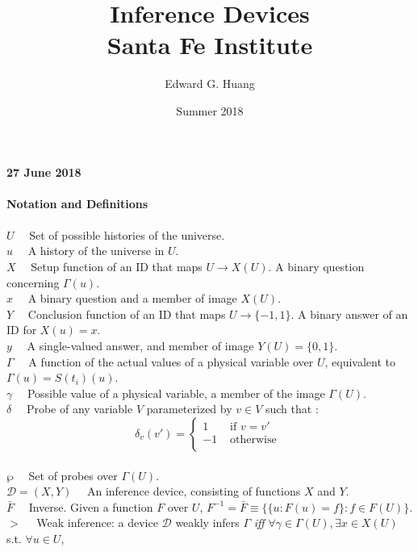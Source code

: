 \documentclass[11pt]{article}
\title{
  Inference Devices \\
  \large Santa Fe Institute}
\author{Edward G. Huang}
\date{Summer 2018}
\begin{document}

\textbf{27 June 2018} \\
\\
\textbf{Notation and Definitions} \\
\\
$ U \quad $ Set of possible histories of the universe. \\
$ u \quad $ A history of the universe in $ U $. \\ 
$ X \quad $ Setup function of an ID that maps $ U \rightarrow X(U) $. A binary question concerning $ \Gamma(u) $. \\
$ x \quad $ A binary question and a member of image $ X(U) $. \\ 
$ Y \quad $ Conclusion function of an ID that maps $ U \rightarrow \{-1, 1\} $. A binary answer of an ID for  $ X(u) = x $. \\ 
$ y \quad $ A single-valued answer, and member of image $ Y(U)  = \{0, 1\} $. \\ 
$ \Gamma \quad $ A function of the actual values of a physical variable over $U$, equivalent to $\Gamma(u) = S(t_i)(u)$.  \\
$ \gamma \quad $ Possible value of a physical variable, a member of the image $\Gamma(U)$. \\
$ \delta \quad $ Probe of any variable $V$ parameterized by $v \in V$ such that : 
	  \[ \delta_v (v') =
	  \begin{cases} 
       1 & \text{ if } v = v' \\
       -1 & \text{ otherwise } \\
      \end{cases}\] \\
$ \wp \quad $ Set of probes over $\Gamma(U)$. \\
$ \mathcal{D} = (X, Y) \quad $ An inference device, consisting of functions $ X $ and $ Y $. \\
$ \bar{F} \quad $ Inverse. Given a function $ F $ over $ U $, $F ^ {-1} = \bar{F} \equiv \{\{u : F(u) = f \} : f \in F(U) \} $. \\
$ > \quad $ Weak inference: a device $\mathcal{D}$ weakly infers $\Gamma$ \textit{iff} $ \forall \gamma \in \Gamma(U), \exists x \in X(U) $ s.t. $ \forall u \in U $, 
\end{document}

